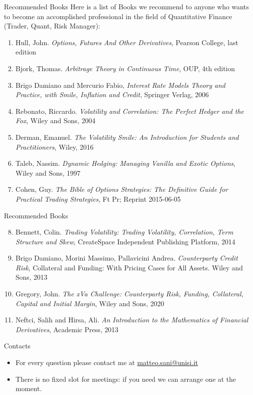 \documentclass{beamer}
\begin{document}
\begin{frame}{Recommended Books}
	Here is a list of Books we recommend to anyone who wants to become an accomplished professional in the field of Quantitative Finance (Trader, Quant, Risk Manager):
	\begin{enumerate}
	\item Hull, John. \textit{Options, Futures And Other Derivatives}, Pearson College, last edition
	\item Bjork, Thomas. \textit{Arbitrage Theory in Continuous Time}, OUP, 4th edition
	\item Brigo Damiano and Mercurio Fabio, \textit{Interest Rate Models Theory and Practice, with Smile, Inflation and Credit}, Springer Verlag, 2006
	\item Rebonato, Riccardo. \textit{Volatility and Correlation: The Perfect Hedger and the Fox}, Wiley and Sons, 2004
	\item Derman, Emanuel. \textit{The Volatility Smile: An Introduction for Students and Practitioners}, Wiley, 2016
	\item Taleb, Nassim. \textit{Dynamic Hedging: Managing Vanilla and Exotic Options}, Wiley and Sons, 1997
	\item Cohen, Guy. \textit{The Bible of Options Strategies: The Definitive Guide for Practical Trading Strategies}, Ft Pr; Reprint 2015-06-05
\end{enumerate}
\end{frame}

\begin{frame}{Recommended Books}
	\begin{enumerate}
		\setcounter{enumi}{7}
		\item Bennett, Colin. \textit{Trading Volatility: Trading Volatility, Correlation, Term Structure and Skew}, CreateSpace Independent Publishing Platform, 2014
		\item Brigo Damiano, Morini Massimo, Pallavicini Andrea. \textit{Counterparty Credit Risk}, Collateral and Funding: With Pricing Cases for All Assets. Wiley and Sons, 2013
		\item Gregory, John. \textit{The xVa Challenge: Counterparty Risk, Funding, Collateral, Capital and Initial Margin}, Wiley and Sons, 2020
		\item Neftci, Salih and Hirsa, Ali. \textit{An Introduction to the Mathematics of Financial Derivatives}, Academic Press, 2013
	\end{enumerate}
\end{frame}

\begin{frame}{Contacts}
	\begin{itemize}
		\item For every question please contact me at \href{mailto:matteo.sani@unisi.it}{matteo.sani@unisi.it}
		\item There is no fixed slot for meetings: if you need we can arrange one at the moment. 		
	\end{itemize}
\end{frame}
\end{document}
